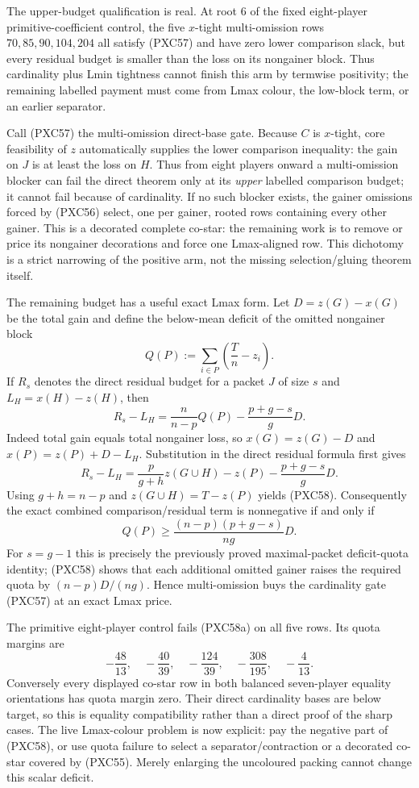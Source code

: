 \documentclass[11pt]{article}
\begin{document}
The upper-budget qualification is real.  At root $6$ of the fixed
eight-player primitive-coefficient control, the five $x$-tight
multi-omission rows $70,85,90,104,204$ all satisfy (PXC57) and have zero
lower comparison slack, but every residual budget is smaller than the loss
on its nongainer block.  Thus cardinality plus Lmin tightness cannot finish
this arm by termwise positivity; the remaining labelled payment must come
from Lmax colour, the low-block term, or an earlier separator.

Call (PXC57) the multi-omission direct-base gate.  Because $C$ is
$x$-tight, core feasibility of $z$ automatically supplies the lower
comparison inequality: the gain on $J$ is at least the loss on $H$.
Thus from eight players onward a multi-omission blocker can fail the direct
theorem only at its \emph{upper} labelled comparison budget; it cannot fail
because of cardinality.  If no such blocker exists, the gainer omissions
forced by (PXC56) select, one per gainer, rooted rows containing every other
gainer.  This is a decorated complete co-star: the remaining work is to
remove or price its nongainer decorations and force one Lmax-aligned row.
This dichotomy is a strict narrowing of the positive arm, not the missing
selection/gluing theorem itself.

The remaining budget has a useful exact Lmax form.  Let
$D=z(G)-x(G)$ be the total gain and define the below-mean deficit of the
omitted nongainer block
\[
 Q(P):=\sum_{i\in P}\left(\frac Tn-z_i\right).
\]
If $R_s$ denotes the direct residual budget for a packet $J$ of size $s$
and $L_H=x(H)-z(H)$, then
\[
 \boxed{\qquad
 R_s-L_H=\frac{n}{n-p}Q(P)-\frac{p+g-s}{g}D .
 \qquad}                                             \tag{PXC58}
\]
Indeed total gain equals total nongainer loss, so
$x(G)=z(G)-D$ and $x(P)=z(P)+D-L_H$.  Substitution in the direct residual
formula first gives
\[
 R_s-L_H=\frac{p}{g+h}z(G\cup H)-z(P)
          -\frac{p+g-s}{g}D.
\]
Using $g+h=n-p$ and $z(G\cup H)=T-z(P)$ yields (PXC58).
Consequently the exact combined comparison/residual term is nonnegative if
and only if
\[
 Q(P)\ge \frac{(n-p)(p+g-s)}{ng}D.                  \tag{PXC58a}
\]
For $s=g-1$ this is precisely the previously proved maximal-packet
deficit-quota identity; (PXC58) shows that each additional omitted gainer
raises the required quota by $(n-p)D/(ng)$.  Hence multi-omission buys the
cardinality gate (PXC57) at an exact Lmax price.

The primitive eight-player control fails (PXC58a) on all five rows.  Its
quota margins are
\[
 -\frac{48}{13},\quad -\frac{40}{39},\quad -\frac{124}{39},\quad
 -\frac{308}{195},\quad -\frac4{13}.
\]
Conversely every displayed co-star row in both balanced seven-player
equality orientations has quota margin zero.  Their direct cardinality bases
are below target, so this is equality compatibility rather than a direct
proof of the sharp cases.  The live Lmax-colour problem is now explicit: pay
the negative part of (PXC58), or use quota failure to select a
separator/contraction or a decorated co-star covered by (PXC55).  Merely
enlarging the uncoloured packing cannot change this scalar deficit.
\end{document}
